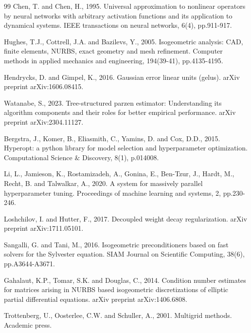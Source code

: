 \documentclass{article}
\theoremstyle{plain}
\numberwithin{equation}{section}
\begin{document}
\begin{thebibliography}{99}
    Chen, T. and Chen, H., 1995. Universal approximation to nonlinear operators by neural networks with arbitrary activation functions and its application to dynamical systems. IEEE transactions on neural networks, 6(4), pp.911-917.

    Hughes, T.J., Cottrell, J.A. and Bazilevs, Y., 2005. Isogeometric analysis: CAD, finite elements, NURBS, exact geometry and mesh refinement. Computer methods in applied mechanics and engineering, 194(39-41), pp.4135-4195.

    Hendrycks, D. and Gimpel, K., 2016. Gaussian error linear units (gelus). arXiv preprint arXiv:1606.08415.

    Watanabe, S., 2023. Tree-structured parzen estimator: Understanding its algorithm components and their roles for better empirical performance. arXiv preprint arXiv:2304.11127.

    Bergstra, J., Komer, B., Eliasmith, C., Yamins, D. and Cox, D.D., 2015. Hyperopt: a python library for model selection and hyperparameter optimization. Computational Science $\&$ Discovery, 8(1), p.014008.

    Li, L., Jamieson, K., Rostamizadeh, A., Gonina, E., Ben-Tzur, J., Hardt, M., Recht, B. and Talwalkar, A., 2020. A system for massively parallel hyperparameter tuning. Proceedings of machine learning and systems, 2, pp.230-246.

    Loshchilov, I. and Hutter, F., 2017. Decoupled weight decay regularization. arXiv preprint arXiv:1711.05101.

    Sangalli, G. and Tani, M., 2016. Isogeometric preconditioners based on fast solvers for the Sylvester equation. SIAM Journal on Scientific Computing, 38(6), pp.A3644-A3671.

    Gahalaut, K.P., Tomar, S.K. and Douglas, C., 2014. Condition number estimates for matrices arising in NURBS based isogeometric discretizations of elliptic partial differential equations. arXiv preprint arXiv:1406.6808.

    Trottenberg, U., Oosterlee, C.W. and Schuller, A., 2001. Multigrid methods. Academic press.


\end{thebibliography}
\end{document}

